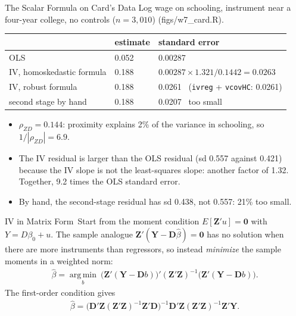 \documentclass[aspectratio=169,11pt,xcolor=dvipsnames]{beamer}
\newcommand{\srcp}[1]{{\scriptsize\color{gray}(#1)}}
\DeclareMathOperator*{\argminop}{arg\,min}
\newcommand{\argmin}{\argminop\limits}
\newcommand{\E}{E}
\newcommand{\zero}{\bm{0}}
\newcommand{\adv}{\,\raisebox{0.6pt}{\textcolor{accent}{$\bigstar$}}}
\begin{document}
\begin{frame}{The Scalar Formula on Card's Data}
Log wage on schooling, instrument near a four-year college, no controls
($n = 3{,}010$) \srcp{figs/w7\_card.R}.
\vskip3pt
\begin{center}\small
\renewcommand{\arraystretch}{1.15}
\begin{tabular}{@{}lll@{}}
\toprule
 & estimate & standard error \\
\midrule
OLS & 0.052 & 0.00287 \\
IV, homoskedastic formula & 0.188 & $0.00287 \times 1.321 / 0.1442 = 0.0263$ \\
IV, robust formula & 0.188 & 0.0261 \ (\texttt{ivreg} + \texttt{vcovHC}: 0.0261) \\
second stage by hand & 0.188 & 0.0207 \ \alert{too small} \\
\bottomrule
\end{tabular}
\end{center}
\vskip3pt
\begin{itemize}\itemsep2pt
  \item $\rho_{ZD} = 0.144$: proximity explains 2\% of the variance in
        schooling, so $1/|\rho_{ZD}| = 6.9$.
  \item The IV residual is larger than the OLS residual (sd 0.557 against
        0.421) because the IV slope is not the least-squares slope: another
        factor of 1.32. Together, 9.2 times the OLS standard error.
  \item By hand, the second-stage residual has sd 0.438, not 0.557: 21\% too small.
\end{itemize}
\end{frame}

\begin{frame}{IV in Matrix Form\adv}
Start from the moment condition $\E[\bm Z' u] = \zero$ with $Y = D\beta_0 + u$.
The sample analogue $\bm Z'(\bm Y - \bm D\hat\beta) = \zero$ has no solution
when there are more instruments than regressors, so instead \emph{minimize} the
sample moments in a weighted norm:
\begin{align*}
  \hat\beta = \argmin_{b}\ \big(\bm Z'(\bm Y-\bm Db)\big)'
  (\bm Z'\bm Z)^{-1}\big(\bm Z'(\bm Y-\bm Db)\big) .
\end{align*}
The first-order condition gives
\begin{align*}
  \hat\beta = \Big(\bm D'\bm Z(\bm Z'\bm Z)^{-1}\bm Z'\bm D\Big)^{-1}
              \bm D'\bm Z(\bm Z'\bm Z)^{-1}\bm Z'\bm Y .
\end{align*}
\end{frame}
\end{document}
